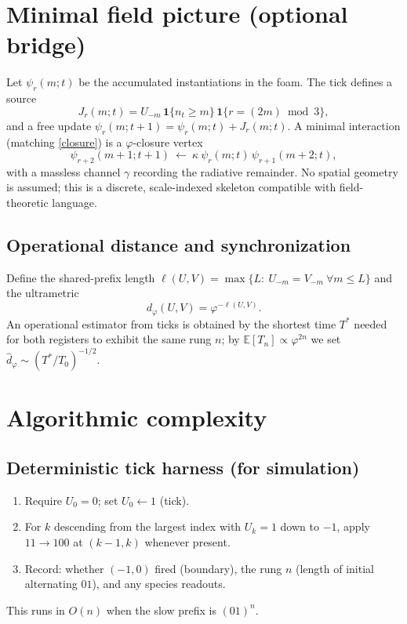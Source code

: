 \documentclass[11pt]{article}
\theoremstyle{remark}
\begin{document}
\section{Minimal field picture (optional bridge)}\label{sec:field}
Let $\psi_r(m;t)$ be the accumulated instantiations in the foam.
The tick defines a source
\begin{equation}
J_r(m;t)=U_{-m}\,\mathbf 1\{n_t\ge m\}\,\mathbf 1\{r=(2m)\bmod3\},
\end{equation}
and a free update $\psi_r(m;t{+}1)=\psi_r(m;t)+J_r(m;t)$.
A minimal interaction (matching \eqref{closure}) is a $\varphi$-closure vertex
\begin{equation}
\psi_{r+2}(m{+}1;t{+}1)\ \leftarrow\ \kappa\ \psi_{r}(m;t)\,\psi_{r+1}(m{+}2;t),
\end{equation}
with a massless channel $\gamma$ recording the radiative remainder.
No spatial geometry is assumed; this is a discrete, scale-indexed skeleton compatible with field-theoretic language.



\subsection*{Operational distance and synchronization}
Define the shared-prefix length $\ell(U,V)=\max\{L:\ U_{-m}=V_{-m}\ \forall m\le L\}$ and the ultrametric
\[
d_\varphi(U,V)=\varphi^{-\ell(U,V)}.
\]
An operational estimator from ticks is obtained by the shortest time $T^\ast$ needed for both registers to exhibit the same rung $n$; by $\mathbb E[T_n]\propto\varphi^{2n}$ we set
\(
\widehat d_\varphi\sim (T^\ast/T_0)^{-1/2}.
\)

\section{Algorithmic complexity}

\subsection*{Deterministic tick harness (for simulation)}
\begin{enumerate}
\item Require $U_0=0$; set $U_0\leftarrow 1$ (tick).
\item For $k$ descending from the largest index with $U_k=1$ down to $-1$, apply $11\!\to\!100$ at $(k{-}1,k)$ whenever present.
\item Record: whether $(-1,0)$ fired (boundary), the rung $n$ (length of initial alternating $01$), and any species readouts.
\end{enumerate}
This runs in $O(n)$ when the slow prefix is $(01)^n$.
\end{document}
